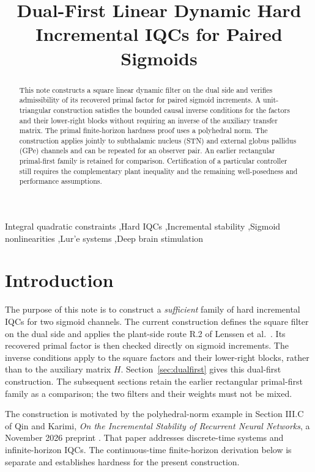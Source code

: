 \documentclass[final,5p,twocolumn]{elsarticle}
\theoremstyle{definition}
\theoremstyle{remark}
\begin{document}
\begin{frontmatter}
\title{Dual-First Linear Dynamic Hard Incremental IQCs for Paired Sigmoids}
\begin{abstract}
This note constructs a square linear dynamic filter on the dual side and verifies admissibility of its recovered primal factor for paired sigmoid increments. A unit-triangular construction satisfies the bounded causal inverse conditions for the factors and their lower-right blocks without requiring an inverse of the auxiliary transfer matrix. The primal finite-horizon hardness proof uses a polyhedral norm. The construction applies jointly to subthalamic nucleus (STN) and external globus pallidus (GPe) channels and can be repeated for an observer pair. An earlier rectangular primal-first family is retained for comparison. Certification of a particular controller still requires the complementary plant inequality and the remaining well-posedness and performance assumptions.
\end{abstract}
\begin{keyword}
Integral quadratic constraints \sep Hard IQCs \sep Incremental stability \sep Sigmoid nonlinearities \sep Lur'e systems \sep Deep brain stimulation
\end{keyword}
\end{frontmatter}

\section{Introduction}
The purpose of this note is to construct a \emph{sufficient} family of hard incremental IQCs for two sigmoid channels. The current construction defines the square filter on the dual side and applies the plant-side route R.2 of Lenssen et al.~\cite{dualPIE}. Its recovered primal factor is then checked directly on sigmoid increments. The inverse conditions apply to the square factors and their lower-right blocks, rather than to the auxiliary matrix $H$. Section~\ref{sec:dualfirst} gives this dual-first construction. The subsequent sections retain the earlier rectangular primal-first family as a comparison; the two filters and their weights must not be mixed.

The construction is motivated by the polyhedral-norm example in Section III.C of Qin and Karimi, \emph{On the Incremental Stability of Recurrent Neural Networks}, a November 2026 preprint \cite{qinKarimi2026}. That paper addresses discrete-time systems and infinite-horizon IQCs. The continuous-time finite-horizon derivation below is separate and establishes hardness for the present construction.
\end{document}
